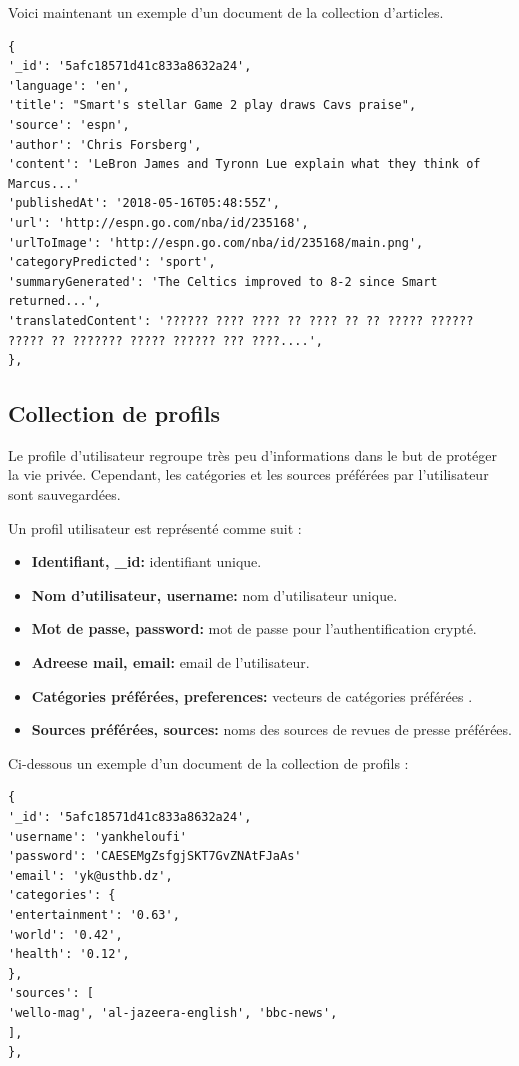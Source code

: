 Voici maintenant un exemple d'un document de la collection d'articles.
\begin{lstlisting}[style=code]
{
'_id': '5afc18571d41c833a8632a24', 
'language': 'en',
'title': "Smart's stellar Game 2 play draws Cavs praise", 
'source': 'espn', 
'author': 'Chris Forsberg', 
'content': 'LeBron James and Tyronn Lue explain what they think of Marcus...'
'publishedAt': '2018-05-16T05:48:55Z', 
'url': 'http://espn.go.com/nba/id/235168',
'urlToImage': 'http://espn.go.com/nba/id/235168/main.png',  
'categoryPredicted': 'sport', 
'summaryGenerated': 'The Celtics improved to 8-2 since Smart returned...', 
'translatedContent': '?????? ???? ???? ?? ???? ?? ?? ????? ?????? ????? ?? ??????? ????? ?????? ??? ????....', 
},
\end{lstlisting}

\subsection{Collection de profils}
Le profile d'utilisateur regroupe très peu d'informations dans le but de protéger la vie privée. Cependant, les catégories et les sources préférées par l'utilisateur sont sauvegardées. 

Un profil utilisateur est représenté comme suit :
\begin{itemize}
    \item \textbf{Identifiant, \textquotedbl  \_id\textquotedbl : } identifiant unique.
    \item \textbf{Nom d'utilisateur, \textquotedbl  username\textquotedbl : } nom d'utilisateur unique.
    \item \textbf{Mot de passe, \textquotedbl  password\textquotedbl : } mot de passe pour l'authentification crypté.
    \item \textbf{Adreese mail, \textquotedbl  email\textquotedbl : } email de l'utilisateur.
    \item \textbf{Catégories préférées, \textquotedbl  preferences\textquotedbl : } vecteurs de catégories préférées .
    \item \textbf{Sources préférées, \textquotedbl  sources\textquotedbl : } noms des sources de revues de presse préférées. 
\end{itemize}

Ci-dessous un exemple d'un document de la collection de profils :
\begin{lstlisting}[style=code]
{
'_id': '5afc18571d41c833a8632a24', 
'username': 'yankheloufi'
'password': 'CAESEMgZsfgjSKT7GvZNAtFJaAs'
'email': 'yk@usthb.dz',
'categories': {
'entertainment': '0.63',
'world': '0.42',
'health': '0.12',
},
'sources': [
'wello-mag', 'al-jazeera-english', 'bbc-news', 
],
},
\end{lstlisting}


